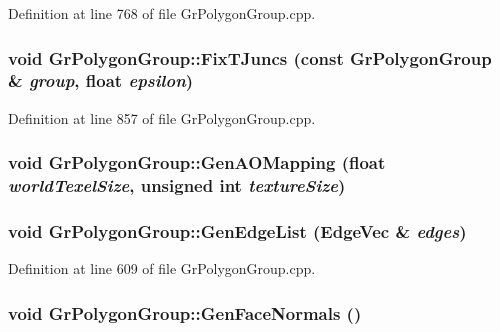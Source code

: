 Definition at line 768 of file GrPolygonGroup.cpp.\hypertarget{class_gr_polygon_group_1f1f0c55854848f37a12efe4f0bb1819}{
\subsubsection[{FixTJuncs}]{\setlength{\rightskip}{0pt plus 5cm}void GrPolygonGroup::FixTJuncs (const {\bf GrPolygonGroup} \& {\em group}, \/  float {\em epsilon})}}
\label{class_gr_polygon_group_1f1f0c55854848f37a12efe4f0bb1819}




Definition at line 857 of file GrPolygonGroup.cpp.\hypertarget{class_gr_polygon_group_8f80c6de500f8d0bed5e3fcb676494ae}{
\subsubsection[{GenAOMapping}]{\setlength{\rightskip}{0pt plus 5cm}void GrPolygonGroup::GenAOMapping (float {\em worldTexelSize}, \/  unsigned int {\em textureSize})}}
\label{class_gr_polygon_group_8f80c6de500f8d0bed5e3fcb676494ae}


\hypertarget{class_gr_polygon_group_a6fbc43f25738738b71f89be14c4de7a}{
\subsubsection[{GenEdgeList}]{\setlength{\rightskip}{0pt plus 5cm}void GrPolygonGroup::GenEdgeList ({\bf EdgeVec} \& {\em edges})}}
\label{class_gr_polygon_group_a6fbc43f25738738b71f89be14c4de7a}




Definition at line 609 of file GrPolygonGroup.cpp.\hypertarget{class_gr_polygon_group_95956f1b189590a55244810b49610fe3}{
\subsubsection[{GenFaceNormals}]{\setlength{\rightskip}{0pt plus 5cm}void GrPolygonGroup::GenFaceNormals ()}}
\label{class_gr_polygon_group_95956f1b189590a55244810b49610fe3}




